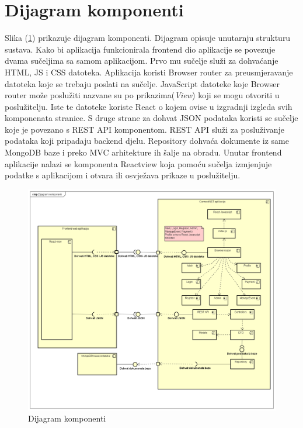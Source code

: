 			\eject
		\section{Dijagram komponenti}
		
		Slika (\ref{fig:DK}) prikazuje dijagram komponenti. Dijagram opisuje unutarnju strukturu sustava. Kako bi aplikacija funkcionirala frontend dio aplikacije se povezuje dvama sučeljima sa samom aplikacijom. Prvo mu sučelje služi za dohvaćanje HTML, JS i CSS datoteka. Aplikacija koristi Browser router za preusmjeravanje datoteka koje se trebaju poslati na sučelje. JavaScript datoteke koje Browser router može poslužiti nazvane su po prikazima(\textit{View}) koji se mogu otvoriti u poslužitelju. Iste te datoteke koriste React o kojem ovise u izgradnji izgleda svih komponenata stranice. S druge strane za dohvat JSON podataka koristi se sučelje koje je povezano s REST API komponentom. REST API služi za posluživanje podataka koji pripadaju backend djelu. Repository dohvaća dokumente iz same MongoDB baze i preko MVC arhitekture ih šalje na obradu. Unutar frontend aplikacije nalazi se komponenta Reactview koja pomoću sučelja izmjenjuje podatke s aplikacijom i otvara ili osvježava prikaze u poslužitelju.
						 
			 \begin{figure}[H]
			\includegraphics[width=\textwidth]{slike/Dijagram komponenti.PNG} %
			\caption{Dijagram komponenti}
			\label{fig:DK} %
		\end{figure}